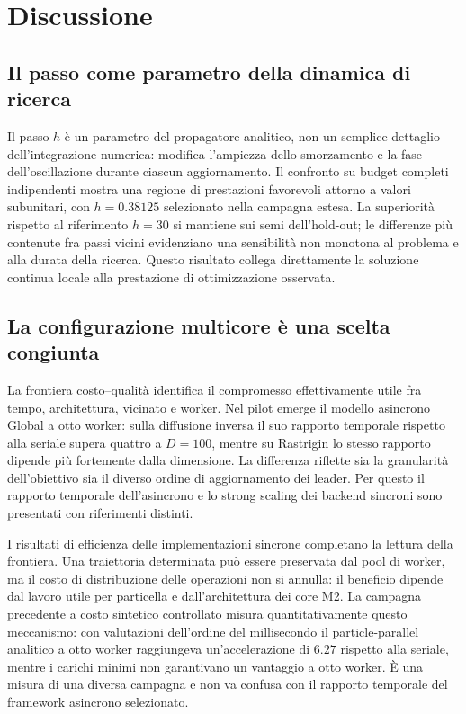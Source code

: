 \section{Discussione}\label{sec:discussion}

\subsection{Il passo come parametro della dinamica di ricerca}
Il passo $h$ è un parametro del propagatore analitico, non un semplice dettaglio dell'integrazione numerica: modifica l'ampiezza dello smorzamento e la fase dell'oscillazione durante ciascun aggiornamento. Il confronto su budget completi indipendenti mostra una regione di prestazioni favorevoli attorno a valori subunitari, con $h=0.38125$ selezionato nella campagna estesa. La superiorità rispetto al riferimento $h=30$ si mantiene sui semi dell'hold-out; le differenze più contenute fra passi vicini evidenziano una sensibilità non monotona al problema e alla durata della ricerca. Questo risultato collega direttamente la soluzione continua locale alla prestazione di ottimizzazione osservata.

\subsection{La configurazione multicore è una scelta congiunta}
La frontiera costo--qualità identifica il compromesso effettivamente utile fra tempo, architettura, vicinato e worker. Nel pilot emerge il modello asincrono Global a otto worker: sulla diffusione inversa il suo rapporto temporale rispetto alla seriale supera quattro a $D=100$, mentre su Rastrigin lo stesso rapporto dipende più fortemente dalla dimensione. La differenza riflette sia la granularità dell'obiettivo sia il diverso ordine di aggiornamento dei leader. Per questo il rapporto temporale dell'asincrono e lo strong scaling dei backend sincroni sono presentati con riferimenti distinti.

I risultati di efficienza delle implementazioni sincrone completano la lettura della frontiera. Una traiettoria determinata può essere preservata dal pool di worker, ma il costo di distribuzione delle operazioni non si annulla: il beneficio dipende dal lavoro utile per particella e dall'architettura dei core M2. La campagna precedente a costo sintetico controllato misura quantitativamente questo meccanismo: con valutazioni dell'ordine del millisecondo il particle-parallel analitico a otto worker raggiungeva un'accelerazione di $6.27$ rispetto alla seriale, mentre i carichi minimi non garantivano un vantaggio a otto worker. È una misura di una diversa campagna e non va confusa con il rapporto temporale del framework asincrono selezionato.

